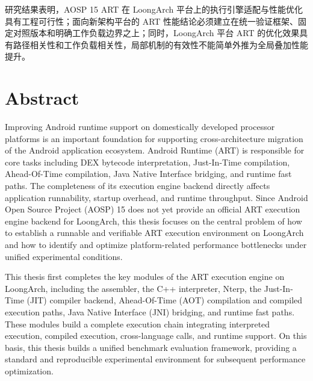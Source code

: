 研究结果表明，AOSP 15 ART 在 LoongArch 平台上的执行引擎适配与性能优化具有工程可行性；面向新架构平台的 ART 性能结论必须建立在统一验证框架、固定对照版本和明确工作负载边界之上；同时，LoongArch 平台 ART 的优化效果具有路径相关性和工作负载相关性，局部机制的有效性不能简单外推为全局叠加性能提升。

\intobmk\chapter*{Abstract}%

Improving Android runtime support on domestically developed processor platforms is an important foundation for supporting cross-architecture migration of the Android application ecosystem. Android Runtime (ART) is responsible for core tasks including DEX bytecode interpretation, Just-In-Time compilation, Ahead-Of-Time compilation, Java Native Interface bridging, and runtime fast paths. The completeness of its execution engine backend directly affects application runnability, startup overhead, and runtime throughput. Since Android Open Source Project (AOSP) 15 does not yet provide an official ART execution engine backend for LoongArch, this thesis focuses on the central problem of how to establish a runnable and verifiable ART execution environment on LoongArch and how to identify and optimize platform-related performance bottlenecks under unified experimental conditions.

This thesis first completes the key modules of the ART execution engine on LoongArch, including the assembler, the C++ interpreter, Nterp, the Just-In-Time (JIT) compiler backend, Ahead-Of-Time (AOT) compilation and compiled execution paths, Java Native Interface (JNI) bridging, and runtime fast paths. These modules build a complete execution chain integrating interpreted execution, compiled execution, cross-language calls, and runtime support. On this basis, this thesis builds a unified benchmark evaluation framework, providing a standard and reproducible experimental environment for subsequent performance optimization.

